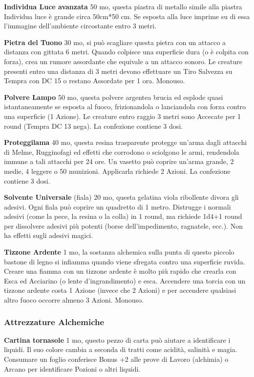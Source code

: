\begin{multicols}{2}
\textbf{Individua Luce avanzata} 50 mo, questa piastra di metallo simile alla piastra Individua luce è grande circa 50cm*50 cm. Se esposta alla luce imprime su di essa l'immagine dell'ambiente circostante entro 3 metri.

\textbf{Pietra del Tuono} 30 mo, si può scagliare questa pietra con un attacco a distanza con gittata 6 metri. Quando colpisce una superficie dura (o è colpita con forza), crea un rumore assordante che equivale a un attacco sonoro. Le creature presenti entro una distanza di 3 metri devono effettuare un Tiro Salvezza su Tempra con DC 15 o restano Assordate per 1 ora. Monouso.

\textbf{Polvere Lampo} 50 mo, questa polvere argentea brucia ed esplode quasi istantaneamente se esposta al fuoco, frizionandola o lanciandola con forza contro una superficie (1 Azione). Le creature entro raggio 3 metri sono Accecate per 1 round (Tempra DC 13 nega). La confezione contiene 3 dosi.

\textbf{Proteggilama} 40 mo, questa resina trasparente protegge un'arma dagli attacchi di Melme, Rugginofagi ed effetti che corrodono o sciolgono le armi, rendendola immune a tali attacchi per 24 ore. Un vasetto può coprire un'arma grande, 2 medie, 4 leggere o 50 munizioni. Applicarla richiede 2 Azioni. La confezione contiene 3 dosi.

\textbf{Solvente Universale} (fiala) 20 mo, questa gelatina viola ribollente divora gli adesivi. Ogni fiala può coprire un quadretto di 1 metro. Distrugge i normali adesivi (come la pece, la resina o la colla) in 1 round, ma richiede 1d4+1 round per dissolvere adesivi più potenti (borse dell'impedimento, ragnatele, ecc.). Non ha effetti sugli adesivi magici.

\textbf{Tizzone Ardente} 1 mo, la sostanza alchemica sulla punta di questo piccolo bastone di legno si infiamma quando viene sfregata contro una superficie ruvida. Creare una fiamma con un tizzone ardente è molto più rapido che crearla con Esca ed Acciarino (o lente d'ingrandimento) e esca. Accendere una torcia con un tizzone ardente costa 1 Azione (invece che 2 Azioni) e per accendere qualsiasi altro fuoco occorre almeno 3 Azioni. Monouso.

\subsubsection{Attrezzature Alchemiche}

\textbf{Cartina tornasole} 1 mo, questo pezzo di carta può aiutare a identificare i liquidi. Il suo colore cambia a seconda di tratti come acidità, salinità e magia. Consumare un foglio conferisce Bonus +2 alle prove di Lavoro (alchimia) o Arcano per identificare Pozioni o altri liquidi.


\end{multicols}
